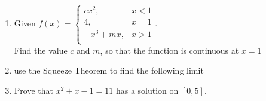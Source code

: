 \documentclass{exam}
\begin{document}
\begin{enumerate}
\vfill

\item
Given
$f(x)=\left\{
\begin{array}{ll}
      cx^{2}, & x < 1 \\
      4     , & x = 1 \\
      -x^{3}+mx,   & x > 1 \\
\end{array} 
\right.$.\\
Find the value $c$ and $m$, so that the function is continuous at $x=1$
\vfill

\item
use the Squeeze Theorem to find the following limit



\newpage


\item
Prove that $x^{2}+x-1=11$ has a solution on $[0, 5]$.
\vfill



\end{enumerate}
\end{document}
